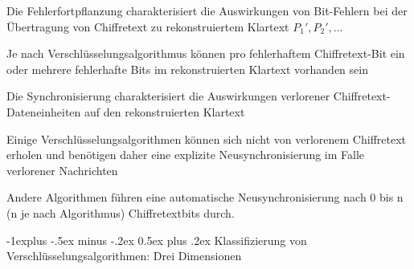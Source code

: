 \documentclass[a4paper]{article}
\makeatletter
\renewcommand{\subsection}{\@startsection{subsection}{2}{0mm}%
 {-1explus -.5ex minus -.2ex}%
 {0.5ex plus .2ex}%
 {\normalfont\normalsize\bfseries}}
\makeatother
\begin{document}
\begin{multicols}{3}
      \begin{itemize*}
            \item Die Fehlerfortpflanzung charakterisiert die Auswirkungen von
            Bit-Fehlern bei der Übertragung von Chiffretext zu rekonstruiertem
            Klartext $P_1', P_2', ...$
            \begin{itemize*}
                  \item Je nach Verschlüsselungsalgorithmus können pro fehlerhaftem Chiffretext-Bit ein oder mehrere fehlerhafte Bits im rekonstruierten Klartext vorhanden sein
            \end{itemize*}
            \item Die Synchronisierung charakterisiert die Auswirkungen verlorener
            Chiffretext-Dateneinheiten auf den rekonstruierten Klartext
            \begin{itemize*}
                  \item Einige Verschlüsselungsalgorithmen können sich nicht von verlorenem Chiffretext erholen und benötigen daher eine explizite Neusynchronisierung im Falle verlorener Nachrichten
                  \item Andere Algorithmen führen eine automatische Neusynchronisierung nach 0 bis n (n je nach Algorithmus) Chiffretextbits durch.
            \end{itemize*}
      \end{itemize*}


      \subsection{Klassifizierung von Verschlüsselungsalgorithmen: Drei
            Dimensionen}


\end{multicols}
\end{document}
